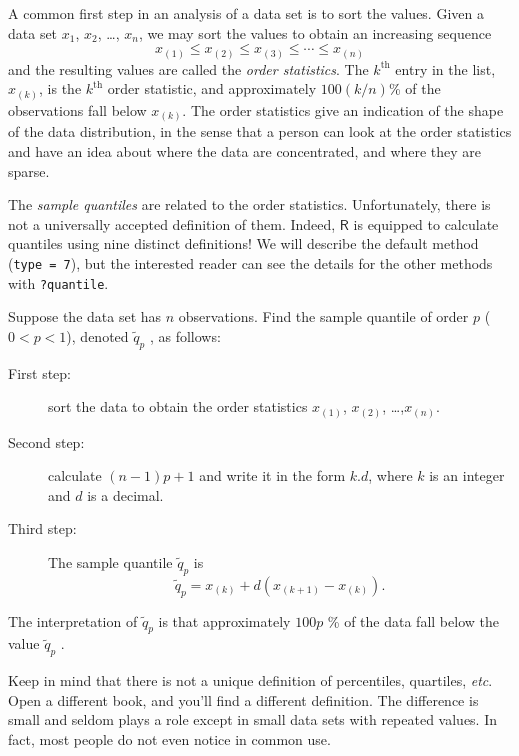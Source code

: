 \documentclass[captions=tableheading]{scrbook}
\begin{document}
A common first step in an analysis of a data set is to sort the values. Given a data set \(x_{1}\), \(x_{2}\), \ldots{}, \(x_{n}\), we may sort the values to obtain an increasing sequence
\begin{equation} 
x_{(1)}\leq x_{(2)}\leq x_{(3)}\leq\cdots\leq x_{(n)}
\end{equation}
and the resulting values are called the \emph{order statistics}. The \(k^{\mathrm{th}}\) entry in the list, \(x_{(k)}\), is the \(k^{\mathrm{th}}\) order statistic, and approximately \(100(k/n)\)\% of the observations fall below \(x_{(k)}\). The order statistics give an indication of the shape of the data distribution, in the sense that a person can look at the order statistics and have an idea about where the data are concentrated, and where they are sparse.

The \emph{sample quantiles} are related to the order statistics. Unfortunately, there is not a universally accepted definition of them. Indeed, \(\mathsf{R}\) is equipped to calculate quantiles using nine distinct definitions! We will describe the default method (\texttt{type = 7}), but the interested reader can see the details for the other methods with \texttt{?quantile}.

Suppose the data set has \(n\) observations. Find the sample quantile of order \(p\) (\(0<p<1\)), denoted \(\tilde{q}_{p}\) , as follows: 

\begin{description}
\item[First step:] sort the data to obtain the order statistics \(x_{(1)}\), \(x_{(2)}\), \ldots{},\(x_{(n)}\).
\item[Second step:] calculate \((n-1)p+1\) and write it in the form \(k.d\), where \(k\) is an integer and \(d\) is a decimal.
\item[Third step:] The sample quantile \(\tilde{q}_{p}\) is
   \begin{equation}
      \tilde{q}_{p}=x_{(k)}+d(x_{(k+1)}-x_{(k)}).
   \end{equation}
\end{description}

The interpretation of \(\tilde{q}_{p}\) is that approximately \(100p\) \% of the data fall below the value \(\tilde{q}_{p}\) . 

Keep in mind that there is not a unique definition of percentiles, quartiles, \emph{etc}. Open a different book, and you'll find a different definition. The difference is small and seldom plays a role except in small data sets with repeated values. In fact, most people do not even notice in common use.
\end{document}
